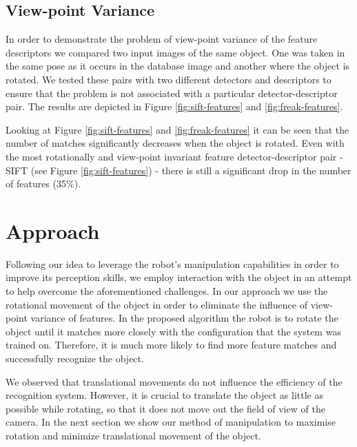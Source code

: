 \subsection{View-point Variance}

In order to demonstrate the problem of view-point variance of the feature descriptors we compared two input images of the same object.  One was taken in the same pose as it occurs in the database image and another where the object is rotated. We tested these pairs with two different detectors and descriptors to ensure that the problem is not associated with a particular detector-descriptor pair. The results are depicted in Figure \ref{fig:sift-features} and \ref{fig:freak-features}.%

Looking at Figure \ref{fig:sift-features} and \ref{fig:freak-features} it can be seen that the number of matches significantly decreases when the object is rotated. Even with the most rotationally and view-point invariant feature detector-descriptor pair - SIFT (see Figure \ref{fig:sift-features}) - there is still a significant drop in the number of features (35$\%$).



\section{Approach}

Following our idea to leverage the robot's manipulation capabilities in order to improve its perception skills, we employ interaction with the object in an attempt to help overcome the aforementioned challenges. In our approach we use the rotational movement of the object in order to eliminate the influence of view-point variance of features.  In the proposed algorithm the robot is to rotate the object until it matches more closely with the configuration that the system was trained on. Therefore, it is much more likely to find more feature matches and successfully recognize the object. 

We observed that translational movements do not influence the efficiency of the recognition system. However, it is crucial to translate the object as little as possible while rotating, so that it does not move out the field of view of the camera. In the next section we show our method of manipulation to maximise rotation and minimize translational movement of the object. 


